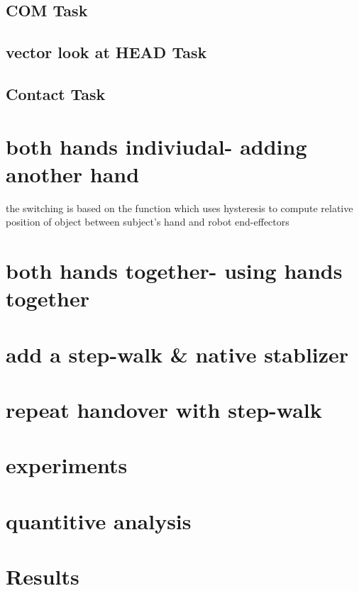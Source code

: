 \subsection{COM Task}

\subsection{vector look at HEAD Task}

\subsection{Contact Task}

\newpage
\section{both hands indiviudal- adding another hand}

the switching is based on the function which  uses hysteresis to compute relative position of object between subject's hand and robot end-effectors 

\newpage
\section{both hands together- using hands together}

\newpage
\section{add a step-walk \& native stablizer}

\newpage
\section{repeat handover with step-walk}

\newpage
\section{experiments}

\newpage
\section{quantitive analysis}

\newpage
\section{Results}

